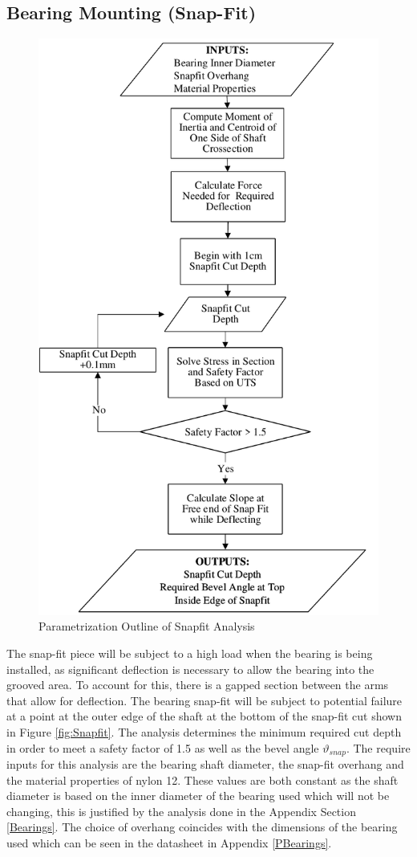 \documentclass[../main.tex]{subfiles}
\begin{document}
\subsection{Bearing Mounting (Snap-Fit)} \label{snapFit}
\begin{figure}[H]
	\centering
	\includegraphics[width=0.75 \textwidth]{img/Paramaterization/snapFit.pdf}
	\caption{Parametrization Outline of Snapfit Analysis}
	\label{fig:snapParamaterization}
\end{figure}

The snap-fit piece will be subject to a high load when the bearing is being installed, as significant deflection is necessary to allow the bearing into the grooved area. To account for this, there is a gapped section between the arms that allow for deflection. The bearing snap-fit will be subject to potential failure at a point at the outer edge of the shaft at the bottom of the snap-fit cut shown in Figure \ref{fig:Snapfit}. The analysis determines the minimum required cut depth in order to meet a safety factor of 1.5 as well as the bevel angle $\vartheta_{snap}$. The require inputs for this analysis are the bearing shaft diameter, the snap-fit overhang and the material properties of nylon 12. These values are both constant as the shaft diameter is based on the inner diameter of the bearing used which will not be changing, this is justified by the analysis done in the Appendix Section \ref{Bearings}. The choice of overhang coincides with the dimensions of the bearing used which can be seen in the datasheet in Appendix \ref{PBearings}.
\end{document}
